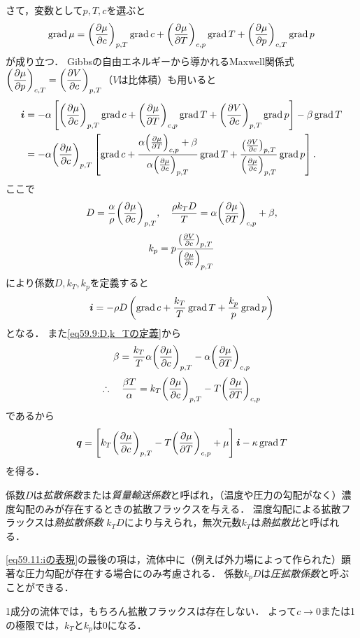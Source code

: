さて，変数として$p,T,c$を選ぶと
\[
    \Grad \mu = \PDV{\mu}{c}{p,T} \Grad c + \PDV{\mu}{T}{c,p} \Grad T + \PDV{\mu}{p}{c,T} \Grad p
\]
が成り立つ．
Gibbsの自由エネルギーから導かれるMaxwell関係式 $\dPDV{\mu}{p}{c,T} = \dPDV{V}{c}{p,T}$（$V$は比体積）も用いると
\begin{align*}
    \vec{i} &= - \alpha \left[ \PDV{\mu}{c}{p,T} \Grad c + \PDV{\mu}{T}{c,p} \Grad T 
    + \PDV{V}{c}{p,T} \Grad p \right] - \beta \Grad T \\
    &= - \alpha \PDV{\mu}{c}{p,T} \left[ \Grad c 
    + \frac{ \alpha\PDV{\mu}{T}{c,p} + \beta }{ \alpha \PDV{\mu}{c}{p,T} } \Grad T 
    + \frac{ \PDV{V}{c}{p,T} }{ \PDV{\mu}{c}{p,T} } \Grad p \right].
\end{align*}
ここで
\setcounter{equation}{8}
\begin{equation}\label{eq59.9:D,k_Tの定義}
    D = \frac{\alpha}{\rho} \PDV{\mu}{c}{p,T}, \quad
    \frac{\rho k_T D}{T} = \alpha\PDV{\mu}{T}{c,p} + \beta,
\end{equation}
\begin{equation}
    k_p = p \frac{ \PDV{V}{c}{p,T} }{ \PDV{\mu}{c}{p,T} }
\end{equation}
により係数$D, k_T, k_p$を定義すると
\begin{equation}\label{eq59.11:iの表現}
    \vb*{i} = -\rho D \left( \operatorname{grad} c + \frac{k_T}{T} \operatorname{grad} T + \frac{k_p}{p} \operatorname{grad} p \right)
\end{equation}
となる．
また\eqref{eq59.9:D,k_Tの定義}から
\[
    \beta = \frac{k_T}{T} \alpha \PDV{\mu}{c}{p,T} - \alpha \PDV{\mu}{T}{c,p}
\]
\[
    \yueni \frac{\beta T}{\alpha} = k_T \PDV{\mu}{c}{p,T} - T \PDV{\mu}{T}{c,p}
\]
であるから
\begin{equation}\label{eq59.12:qの表現}
    \vec{q} = \left[ k_T \PDV{\mu}{c}{p,T} - T \PDV{\mu}{T}{c,p} + \mu \right] \vec{i} - \kappa \Grad T
\end{equation}
を得る．



係数$D$は\emph{拡散係数}または\emph{質量輸送係数}と呼ばれ，（温度や圧力の勾配がなく）濃度勾配のみが存在するときの拡散フラックスを与える．
温度勾配による拡散フラックスは\emph{熱拡散係数} $k_T D$により与えられ，無次元数$k_T$は\emph{熱拡散比}と呼ばれる．



\eqref{eq59.11:iの表現}の最後の項は，流体中に（例えば外力場によって作られた）顕著な圧力勾配が存在する場合にのみ考慮される．
係数$k_pD$は\emph{圧拡散係数}と呼ぶことができる．


1成分の流体では，もちろん拡散フラックスは存在しない．
よって$c \to 0$または1の極限では，$k_T$と$k_p$は0になる．


